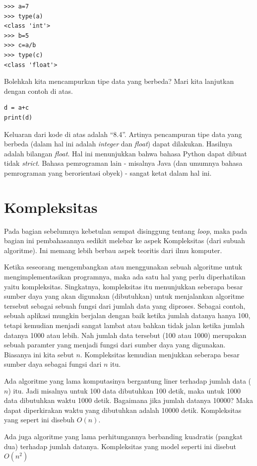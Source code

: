 \begin{verbatim}
>>> a=7
>>> type(a)
<class 'int'>
>>> b=5
>>> c=a/b
>>> type(c)
<class 'float'>
\end{verbatim}

Bolehkah kita mencampurkan tipe data yang berbeda?
Mari kita lanjutkan dengan contoh di atas.
\begin{verbatim}
d = a+c
print(d)
\end{verbatim}
Keluaran dari kode di atas adalah ``8.4''. Artinya pencampuran tipe data
yang berbeda (dalam hal ini adalah {\em integer} dan {\em float}) dapat
dilakukan. Hasilnya adalah bilangan {\em float}.
Hal ini menunjukkan bahwa bahasa Python dapat dibuat tidak {\em strict}.
Bahasa pemrograman lain - misalnya Java (dan umumnya bahasa pemrograman
yang berorientasi obyek) - sangat ketat dalam hal ini.


\section{Kompleksitas}
Pada bagian sebelumnya kebetulan sempat disinggung tentang {\em loop},
maka pada bagian ini pembahasannya sedikit melebar ke aspek Kompleksitas
(dari subuah algoritme).
Ini memang lebih berbau aspek teoritis dari ilmu komputer.

Ketika seseorang mengembangkan atau menggunakan sebuah algoritme untuk
mengimplementasikan programnya, maka ada satu hal yang perlu diperhatikan
yaitu kompleksitas.
Singkatnya, kompleksitas itu menunjukkan seberapa besar sumber daya yang
akan digunakan (dibutuhkan) untuk menjalankan algoritme tersebut sebagai
sebuah fungsi dari jumlah data yang diproses.
Sebagai contoh, sebuah aplikasi mungkin berjalan dengan baik ketika jumlah
datanya hanya 100, tetapi kemudian menjadi sangat lambat atau bahkan tidak
jalan ketika jumlah datanya 1000 atau lebih.
Nah jumlah data tersebut (100 atau 1000) merupakan sebuah paramter yang
menjadi fungsi dari sumber daya yang digunakan. Biasanya ini kita sebut $n$.
Kompleksitas kemudian menjukkan seberapa besar sumber daya sebagai fungsi
dari $n$ itu.

Ada algoritme yang lama komputasinya bergantung liner terhadap jumlah data
($n$) itu. Jadi misalnya untuk 100 data dibutuhkan 100 detik, maka untuk
1000 data dibutuhkan waktu 1000 detik. Bagaimana jika jumlah datanya 10000?
Maka dapat diperkirakan waktu yang dibutuhkan adalah 10000 detik.
Kompleksitas yang sepert ini disebuh $O(n)$.

Ada juga algoritme yang lama perhitungannya berbanding kuadratis (pangkat dua)
terhadap jumlah datanya. 
Kompleksitas yang model seperti ini disebut $O(n^{2})$


